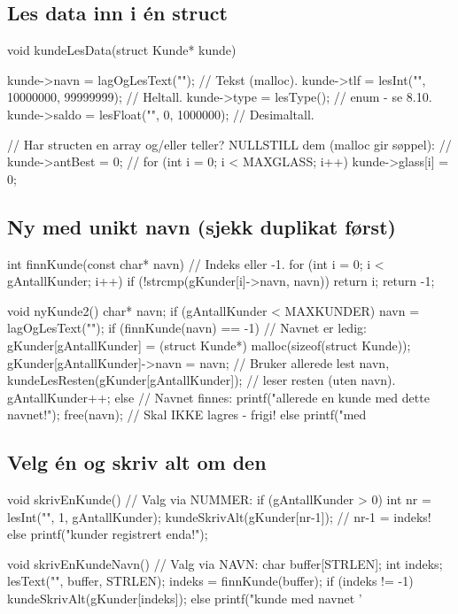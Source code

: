 \subsection{Les data inn i én struct}\label{sec:lesdata}
\begin{kode}
void kundeLesData(struct Kunde* kunde)  {
  kunde->navn  = lagOgLesText("\tNavn");                  //  Tekst (malloc).
  kunde->tlf   = lesInt("\tTelefon", 10000000, 99999999); //  Heltall.
  kunde->type  = lesType();                               //  enum - se 8.10.
  kunde->saldo = lesFloat("\tSaldo", 0, 1000000);         //  Desimaltall.

  //  Har structen en array og/eller teller? NULLSTILL dem (malloc gir søppel):
  //  kunde->antBest = 0;
  //  for (int i = 0;  i < MAXGLASS;  i++)  kunde->glass[i] = 0;
}
\end{kode}

\subsection{Ny med unikt navn (sjekk duplikat først)}\label{sec:unik}
\begin{kode}
int finnKunde(const char* navn)  {                 //  Indeks eller -1.
  for (int i = 0;  i < gAntallKunder;  i++)
      if (!strcmp(gKunder[i]->navn, navn))  return i;
  return -1;
}

void nyKunde2()  {
  char* navn;
  if (gAntallKunder < MAXKUNDER)  {
     navn = lagOgLesText("\tNavn");
     if (finnKunde(navn) == -1)  {                 //  Navnet er ledig:
        gKunder[gAntallKunder] = (struct Kunde*) malloc(sizeof(struct Kunde));
        gKunder[gAntallKunder]->navn = navn;       //  Bruker allerede lest navn,
        kundeLesResten(gKunder[gAntallKunder]);    //    leser resten (uten navn).
        gAntallKunder++;
     } else  {                                     //  Navnet finnes:
        printf("\n\tFinnes allerede en kunde med dette navnet!\n");
        free(navn);                                //  Skal IKKE lagres - frigi!
     }
  } else
     printf("\n\tFullt med %
}
\end{kode}

\subsection{Velg én og skriv alt om den}\label{sec:velgen}
\begin{kode}
void skrivEnKunde()  {                             //  Valg via NUMMER:
  if (gAntallKunder > 0)  {
     int nr = lesInt("\tKundenr", 1, gAntallKunder);
     kundeSkrivAlt(gKunder[nr-1]);                 //  nr-1 = indeks!
  } else
     printf("\n\tIngen kunder registrert enda!\n");
}

void skrivEnKundeNavn()  {                         //  Valg via NAVN:
  char buffer[STRLEN];
  int  indeks;
  lesText("\tNavn", buffer, STRLEN);
  indeks = finnKunde(buffer);
  if (indeks != -1)  kundeSkrivAlt(gKunder[indeks]);
  else  printf("\n\tIngen kunde med navnet '%
}
\end{kode}

